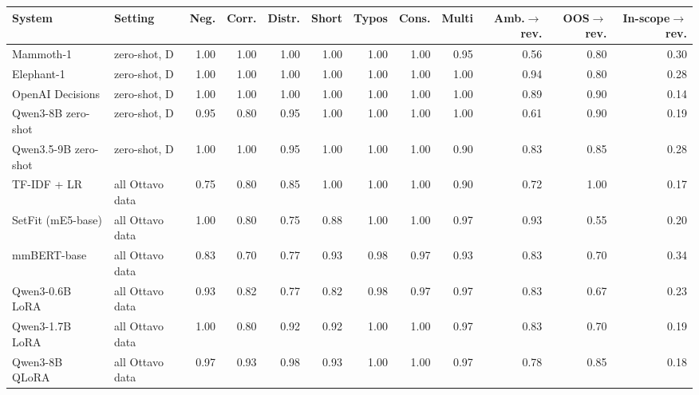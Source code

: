 \begin{tabular}{llrrrrrrrrrr}
\toprule
System & Setting & Neg. & Corr. & Distr. & Short & Typos & Cons. & Multi & Amb.$\to$rev. & OOS$\to$rev. & In-scope$\to$rev. \\
\midrule
Mammoth-1 & zero-shot, D & 1.00 & 1.00 & 1.00 & 1.00 & 1.00 & 1.00 & 0.95 & 0.56 & 0.80 & 0.30 \\
Elephant-1 & zero-shot, D & 1.00 & 1.00 & 1.00 & 1.00 & 1.00 & 1.00 & 1.00 & 0.94 & 0.80 & 0.28 \\
OpenAI Decisions & zero-shot, D & 1.00 & 1.00 & 1.00 & 1.00 & 1.00 & 1.00 & 1.00 & 0.89 & 0.90 & 0.14 \\
Qwen3-8B zero-shot & zero-shot, D & 0.95 & 0.80 & 0.95 & 1.00 & 1.00 & 1.00 & 1.00 & 0.61 & 0.90 & 0.19 \\
Qwen3.5-9B zero-shot & zero-shot, D & 1.00 & 1.00 & 0.95 & 1.00 & 1.00 & 1.00 & 0.90 & 0.83 & 0.85 & 0.28 \\
TF-IDF + LR & all Ottavo data & 0.75 & 0.80 & 0.85 & 1.00 & 1.00 & 1.00 & 0.90 & 0.72 & 1.00 & 0.17 \\
SetFit (mE5-base) & all Ottavo data & 1.00 & 0.80 & 0.75 & 0.88 & 1.00 & 1.00 & 0.97 & 0.93 & 0.55 & 0.20 \\
mmBERT-base & all Ottavo data & 0.83 & 0.70 & 0.77 & 0.93 & 0.98 & 0.97 & 0.93 & 0.83 & 0.70 & 0.34 \\
Qwen3-0.6B LoRA & all Ottavo data & 0.93 & 0.82 & 0.77 & 0.82 & 0.98 & 0.97 & 0.97 & 0.83 & 0.67 & 0.23 \\
Qwen3-1.7B LoRA & all Ottavo data & 1.00 & 0.80 & 0.92 & 0.92 & 1.00 & 1.00 & 0.97 & 0.83 & 0.70 & 0.19 \\
Qwen3-8B QLoRA & all Ottavo data & 0.97 & 0.93 & 0.98 & 0.93 & 1.00 & 1.00 & 0.97 & 0.78 & 0.85 & 0.18 \\
\bottomrule
\end{tabular}